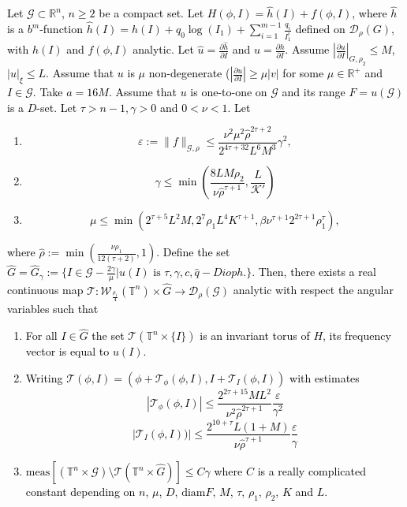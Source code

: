 \textcolor{black}{
\begin{theoremB}
Let $\mathcal{G} \subset \mathbb{R}^n$, $n\geq 2$ be a compact set.
Let $H(\phi, I) = \hat h (I) + f(\phi,I)$, where $\hat h$ is a $b^m$-function $\hat h (I) = h(I) + q_0 \log(I_1) + \sum_{i=1}^{m-1} \frac{q_i}{I_1^i}$ defined on $\mathcal{D}_\rho(G)$, with $h(I)$ and $f(\phi,I)$ analytic.
Let $\hat u = \frac{\partial \hat h}{\partial I}$ and $u = \frac{\partial h}{\partial I}$.
Assume $|\frac{\partial u}{\partial I}|_{G,\rho_2} \leq M$, $|u|_\xi \leq L$.
Assume that $u$ is $\mu$ non-degenerate ($|\frac{\partial u}{\partial I}|\geq \mu|v|$ for some $\mu \in \mathbb{R}^+$ and $I \in \mathcal{G}$. Take $a = 16M$.
Assume that $u$ is one-to-one on $\mathcal{G}$ and its range $F = u(\mathcal{G})$ is a $D$-set.
Let $\tau>n-1,\gamma>0$ and $0 < \nu < 1$. Let
\begin{enumerate}
\item \begin{equation}\label{eq:int_kam1}
\varepsilon:=\|f\|_{\mathcal{G}, \rho} \leq \frac{\nu^2 \mu^2 \hat \rho^{2\tau+2}}{2^{4\tau+32}L^6M^3} \gamma^2,
\end{equation}
\item \begin{equation}\label{eq:int_kam2}
\gamma \leq \min(\frac{8LM\rho_2}{\nu \hat \rho^{\tau+1}}, \frac{L}{\mathcal{K}'})
\end{equation}
\item \begin{equation}\label{eq:int_kam3}
\mu \leq \min(2^{\tau+5}L^2 M,2^7\rho_1 L^4 K^{\tau+1},\beta\nu^{\tau+1}2^{2\tau+1}\rho_1^\tau),
\end{equation}
\end{enumerate}
where $\hat \rho := \min \left(\frac{\nu\rho_1}{12(\tau+2)},1\right)$.
Define the set $\hat G = \hat G_\gamma := \{I \in  \mathcal{G}-\frac{2\gamma}{\mu} | u(I) \text{ is } \tau,\gamma,c,\hat q- Dioph.\}$.
Then, there exists a real continuous map $\mathcal{T}: \mathcal{W}_{\frac{\rho_1}{4}}(\mathbb{T}^n)\times \hat G \rightarrow \mathcal{D}_\rho(\mathcal{G})$ analytic with respect the angular variables such that
\begin{enumerate}
\item\label{kam:point1} For all $I \in \hat G$ the set $\mathcal{T}(\mathbb{T}^n\times \{I\})$ is an invariant torus of $H$, its frequency vector is equal to $u(I)$.
\item\label{kam:point2} Writing $\mathcal{T}(\phi,I)=(\phi + \mathcal{T}_\phi(\phi,I), I + \mathcal{T}_I(\phi,I))$ with estimates
$$|\mathcal{T}_\phi(\phi,I)| \leq \frac{2^{2\tau + 15} M L^2}{\nu^2 \hat \rho^{2\tau+1}}\frac{\varepsilon}{\gamma^2}$$
$$|\mathcal{T}_I(\phi,I))| \leq \frac{2^{10+\tau} L (1+M)}{\nu \hat \rho^{\tau+1}}\frac{\varepsilon}{\gamma}$$
\item\label{kam:point3} $\text{meas} [(\mathbb{T}^n\times \mathcal{G})\setminus\mathcal{T}(\mathbb{T}^n\times \hat G)] \leq C \gamma$ where $C$ is
a really complicated constant depending on $n$,  $\mu$,  $D$,  $\text{diam} F$,  $M$, $\tau$, $\rho_1$, $\rho_2$, $K$ and $L$.
\end{enumerate}
\end{theoremB}
}



